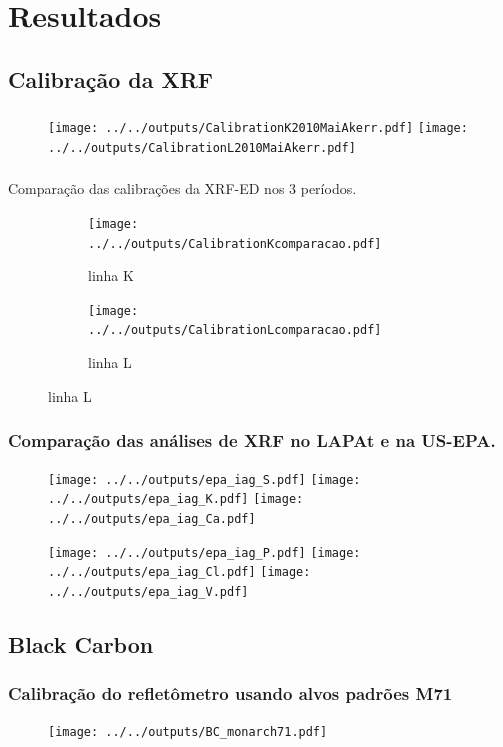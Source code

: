\section{Resultados}

\subsection{Calibração da XRF}

\begin{frame}
  \frametitle{}
  \begin{figure}
      \centering
      \texttt{[image: ../../outputs/CalibrationK2010MaiAkerr.pdf]}
      \texttt{[image: ../../outputs/CalibrationL2010MaiAkerr.pdf]}
  \end{figure}
\end{frame}

\begin{frame}
  \frametitle{}
  Comparação das calibrações da XRF-ED nos 3 períodos.
  \begin{figure}[H]
    \begin{subfigure}[b]{0.5\textwidth}
      \texttt{[image: ../../outputs/CalibrationKcomparacao.pdf]}
      \caption{linha K}
    \end{subfigure}%
    \begin{subfigure}[b]{0.5\textwidth}
      \texttt{[image: ../../outputs/CalibrationLcomparacao.pdf]}
      \caption{linha L}
    \end{subfigure}
  \end{figure}
\end{frame}


\begin{frame}
  \frametitle{Comparação das análises de XRF no LAPAt e na US-EPA.}
  \begin{figure}[H]
    \centering
      \texttt{[image: ../../outputs/epa\_iag\_S.pdf]}
      \texttt{[image: ../../outputs/epa\_iag\_K.pdf]}
      \texttt{[image: ../../outputs/epa\_iag\_Ca.pdf]}
  \end{figure}
    \begin{figure}[H]
    	\centering
    	\texttt{[image: ../../outputs/epa\_iag\_P.pdf]}
    	\texttt{[image: ../../outputs/epa\_iag\_Cl.pdf]}
    	\texttt{[image: ../../outputs/epa\_iag\_V.pdf]}
    \end{figure}
\end{frame}

\subsection{Black Carbon}
\begin{frame}
  \frametitle{Calibração do refletômetro usando alvos padrões M71}
  \begin{figure}[H]
    \centering
    \texttt{[image: ../../outputs/BC\_monarch71.pdf]}
  \end{figure}
\end{frame}

